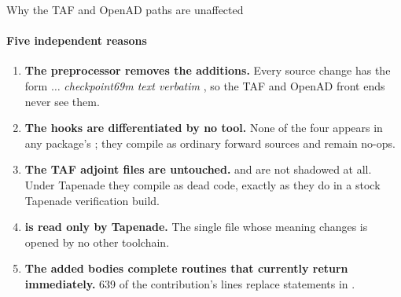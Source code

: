 
\begin{frame}{Why the TAF and OpenAD paths are unaffected}
  \framesubtitle{Five independent reasons}

\begin{enumerate}\small
  \item \textbf{The preprocessor removes the additions.} Every source change
        has the form  $\ldots$ 
        \emph{checkpoint69m text verbatim} , so the TAF and OpenAD
        front ends never see them.
  \item \textbf{The hooks are differentiated by no tool.} None of the four
        appears in any package's ; they compile as
        ordinary forward sources and remain no-ops.
  \item \textbf{The TAF adjoint files are untouched.}
         and  are not
        shadowed at all. Under Tapenade they compile as dead code, exactly as
        they do in a stock Tapenade verification build.
  \item \textbf{ is read only by Tapenade.} The single file
        whose meaning changes is opened by no other toolchain.
  \item \textbf{The added bodies complete routines that currently return
        immediately.} 639 of the contribution's lines replace 
        statements in .
\end{enumerate}

\end{frame}


